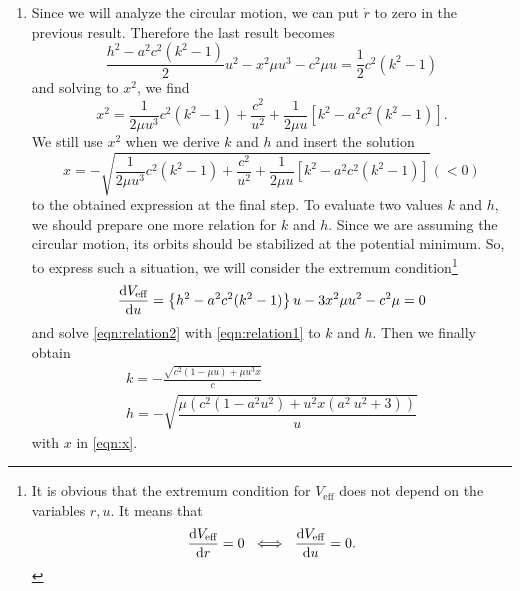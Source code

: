 \documentclass[a4paper,pdftex,10pt]{article}
\begin{document}
\begin{enumerate}
        \item 
        Since we will analyze the circular motion, we can put $\dot{r}$ to zero in the previous result. Therefore the last result becomes
        \begin{equation}          
          \frac{h^2-a^2c^2(k^2-1)}{2}u^2
          -
          x^2\mu u^3
          -
          c^2\mu u
          =
          \frac{1}{2}c^2(k^2-1)
          \label{eqn:relation1}
        \end{equation}
        and solving to $x^2$, we find
        \begin{equation}
          x^2
          =
          \frac{1}{2\mu u^3}c^2(k^2-1)
          +
          \frac{c^2}{u^2}
          +
          \frac{1}{2\mu u}\left[ k^2-a^2c^2(k^2-1) \right]
          .
        \end{equation}
        We still use $x^2$ when we derive $k$ and $h$ and insert the solution
        \begin{equation}
          x
          =
          -
          \sqrt{
            \frac{1}{2\mu u^3}c^2(k^2-1)
            +
            \frac{c^2}{u^2}
            +
            \frac{1}{2\mu u}\left[ k^2-a^2c^2(k^2-1) \right]
          }
          (<
          0)
          \label{eqn:x}
        \end{equation}
        to the obtained expression at the final step. To evaluate two values $k$ and $h$, we should prepare one more relation for $k$ and $h$. Since we are assuming the circular motion, its orbits should be stabilized at the potential minimum. So, to express such a situation, we will consider the extremum condition\footnote{
          It is obvious that the extremum condition for $V_{\textrm{eff}}$ does not depend on the variables $r, u$. It means that 
          $$
            \dv{V_{\textrm{eff}}}{r}
            =
            0
            \ \iff\ 
            \dv{V_{\textrm{eff}}}{u}
            =
            0
            .
          $$
        }
        \begin{equation}
          \dv{V_{\textrm{eff}}}{u}
          =
          \left\{ h^2-a^2c^2(k^2-1) \right\}u
          -
          3x^2\mu u^2
          -
          c^2\mu
          =
          0
          \label{eqn:relation2}
        \end{equation}
        and solve \eqref{eqn:relation2} with \eqref{eqn:relation1} to $k$ and $h$. Then we finally obtain 
        \begin{gather}
          k
          =
          -\frac{\sqrt{c^2 (1-\mu  u)+\mu  u^3 x}}{c}
          \\
          h
          =
          -
          \sqrt{\dfrac{\mu  \left(c^2 \left(1-a^2 u^2\right)+u^2 x \left(a^2 \
          u^2+3\right)\right)}{u}}
        \end{gather}
        with $x$ in \eqref{eqn:x}.



\end{enumerate}
\end{document}
